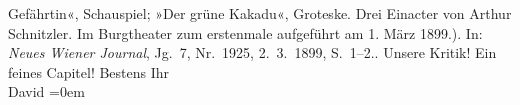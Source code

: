 \begin{ledgroupsized}[t]{13cm}
{{{{                        Gefährtin«, Schauspiel; »Der grüne Kakadu«, Groteske. Drei Einacter von
                        Arthur Schnitzler. Im Burgtheater zum erstenmale aufgeführt am 1. März
                        1899.)}. In: \emph{Neues Wiener Journal},
                     Jg. 7, Nr. 1925, 2. 3. 1899, S. 1–2.}}}\label{K_L00897-2h}. Unsere Kritik!
               Ein feines Capitel! \pend
           \pstart
           Bestens Ihr{\\[\baselineskip]}\spacefill\mbox{David}\pend
           \leftskip=0em{}
         
         \endnumbering{}\end{ledgroupsized}  \newcommand{\dateiname}{L00897}\newcommand{\titel}{Jakob Julius David an Arthur Schnitzler, 3. 3. 1899}\newcommand{\editorInnen}{Martin Anton Müller und Gerd-Hermann Susen}
      